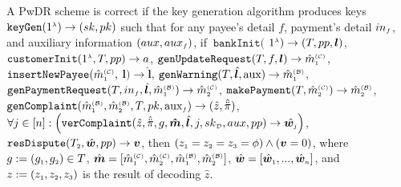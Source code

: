 \begin{definition}[Correctness] A PwDR scheme is correct if the key generation algorithm produces keys $\mathtt{keyGen}(1^{\scriptscriptstyle \lambda})\rightarrow (sk,pk)$ such that for any payee's detail $f$, payment's detail $in_{\scriptscriptstyle f}$, and auxiliary information $(aux, aux_{\scriptscriptstyle f})$, if $\ \mathtt{bankInit}($ $1^{\scriptscriptstyle \lambda})\rightarrow (T, pp, \bm{l})$, $\mathtt{customerInit} (1^{\scriptscriptstyle \lambda}, T, pp)\rightarrow a$, $\mathtt{genUpdateRequest}(T, f, {\bm l})\rightarrow \hat m^{\scriptscriptstyle\mathcal{(C)}}_{\scriptscriptstyle 1}$, $\mathtt{insertNewPayee}(\hat{m}^{\scriptscriptstyle\mathcal{(C)}}_{\scriptscriptstyle 1}, $ ${\bm l})\rightarrow  \hat{\bm l}$, $\mathtt{genWarning}(T, \hat{\bm l}, \text{aux})\rightarrow \hat m^{\scriptscriptstyle\mathcal{(B)}}_{\scriptscriptstyle1}$, $\mathtt{genPaymentRequest}(T, in_{\scriptscriptstyle f}, \hat{\bm{l}}, \hat m^{\scriptscriptstyle\mathcal{(B)}}_{\scriptscriptstyle1})\rightarrow \hat m^{\scriptscriptstyle\mathcal{(C)}}_{\scriptscriptstyle2}$, $\mathtt{makePayment}(T, \hat m^{\scriptscriptstyle\mathcal{(C)}}_{\scriptscriptstyle2})\rightarrow \hat m^{\scriptscriptstyle\mathcal{(B)}}_{\scriptscriptstyle2}$, \\$\mathtt{genComplaint}(\hat m^{\scriptscriptstyle\mathcal{(B)}}_{\scriptscriptstyle 1}, \hat m^{\scriptscriptstyle\mathcal{(B)}}_{\scriptscriptstyle2}, T, pk, \text{aux}_{\scriptscriptstyle f})\rightarrow (\hat z, \hat{\ddot \pi})$, 
$\forall j\in [n]: \Big(\mathtt{verComplaint}( \hat z, \hat{\ddot{\pi}}, g, \bm{\hat{m}}, \hat{\bm{l}}, j, sk_{\scriptscriptstyle\mathcal D}, aux, pp)\rightarrow \hat{\bm{w}_{\scriptscriptstyle j}}\Big)$, \\
 $\mathtt{resDispute}(T_{\scriptscriptstyle 2}, \hat {\bm w}, pp)\rightarrow {\bm v}$, then $(z_{\scriptscriptstyle 1}=z_{\scriptscriptstyle 2}=z_{\scriptscriptstyle 3}=\phi) \wedge({\bm{v}}=0)$, where $g:=(g_{\scriptscriptstyle 1}, g_{\scriptscriptstyle 2})\in T$,   $\hat {\bm m}=[\hat {m}^{\scriptscriptstyle (\mathcal{C})}_{\scriptscriptstyle 1}, \hat {m}^{\scriptscriptstyle (\mathcal{C})}_{\scriptscriptstyle 2}, \hat {m}^{\scriptscriptstyle (\mathcal{B})}_{\scriptscriptstyle 1}, \hat {m}^{\scriptscriptstyle (\mathcal{B})}_{\scriptscriptstyle 2}]$,   $\hat {\bm w}=[{\hat{\bm w}}_{\scriptscriptstyle 1},...,{\hat{\bm w}}_{\scriptscriptstyle n}]$,  and $z:=(z_{\scriptscriptstyle 1}, z_{\scriptscriptstyle 2}, z_{\scriptscriptstyle 3})$ is the result of  decoding  $\hat{z}$.
\end{definition}





